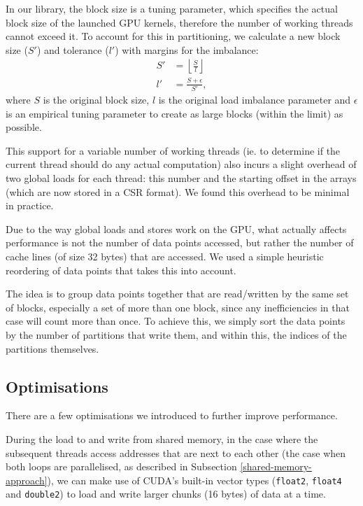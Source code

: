 In our library, the block size is a tuning parameter, which specifies the actual
block size of the launched GPU kernels, therefore the number of working threads
cannot exceed it. To account for this in partitioning, we calculate a new block
size ($S'$) and tolerance ($l'$) with margins for the imbalance:
\begin{align}
  S' &= \left\lfloor \frac{S}{l} \right\rfloor \\
  l' &= \frac{S + \epsilon}{S'},
\end{align}
where $S$ is the original block size, $l$ is the original load imbalance
parameter and $\epsilon$ is an empirical tuning parameter to create as large
blocks (within the limit) as possible.

This support for a variable number of working threads (ie. to determine if the
current thread should do any actual computation) also incurs a slight overhead
of two global loads for each thread: this number and the starting offset in the
arrays (which are now stored in a CSR format). We found this overhead to be
minimal in practice.

Due to the way global loads and stores work on the GPU, what actually affects
performance is not the number of data points accessed, but rather the number of
cache lines (of size 32 bytes) that are accessed. We used a simple heuristic
reordering of data points that takes this into account.

The idea is to group data points together that are read/written by the same set
of blocks, especially a set of more than one block, since any inefficiencies in
that case will count more than once. To achieve this, we simply sort the data
points by the number of partitions that write them, and within this, the indices
of the partitions themselves.

\subsection{Optimisations}\label{optimisations}

There are a few optimisations we introduced to further improve performance.

During the load to and write from shared memory, in the case where the
subsequent threads access addresses that are next to each other (the case when
both loops are parallelised, as described in Subsection
\ref{shared-memory-approach}), we can make use of CUDA's built-in vector
types (\lstinline!float2!, \lstinline!float4! and \lstinline!double2!) to load
and write larger chunks (16 bytes) of data at a time.

